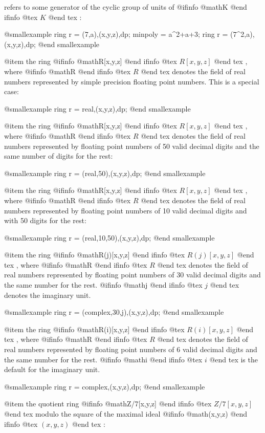 refers to some generator of the cyclic group of units of 
@ifinfo
@math{K}
@end ifinfo
@tex
$K$
@end tex
:

@smallexample
ring r = (7,a),(x,y,z),dp; minpoly = a^2+a+3;
ring r = (7^2,a),(x,y,z),dp;
@end smallexample

@item
the ring 
@ifinfo
@math{R[x,y,z]}
@end ifinfo
@tex
$R[x,y,z]$
@end tex
, where 
@ifinfo
@math{R}
@end ifinfo
@tex
$R$
@end tex
 denotes the field of real
numbers represented by simple precision floating point numbers. This is
a special case:

@smallexample
ring r = real,(x,y,z),dp;
@end smallexample

@item
the ring 
@ifinfo
@math{R[x,y,z]}
@end ifinfo
@tex
$R[x,y,z]$
@end tex
, where 
@ifinfo
@math{R}
@end ifinfo
@tex
$R$
@end tex
 denotes the field of real
numbers represented by floating point numbers of 50 valid decimal digits
and the same number of digits for the rest:

@smallexample
ring r = (real,50),(x,y,z),dp;
@end smallexample

@item
the ring 
@ifinfo
@math{R[x,y,z]}
@end ifinfo
@tex
$R[x,y,z]$
@end tex
, where 
@ifinfo
@math{R}
@end ifinfo
@tex
$R$
@end tex
 denotes the field of real
numbers represented by floating point numbers of 10 valid decimal digits
and with 50 digits for the rest:

@smallexample
ring r = (real,10,50),(x,y,z),dp;
@end smallexample

@item
the ring 
@ifinfo
@math{R(j)[x,y,z]}
@end ifinfo
@tex
$R(j)[x,y,z]$
@end tex
, where 
@ifinfo
@math{R}
@end ifinfo
@tex
$R$
@end tex
 denotes the field of real
numbers represented by floating point numbers of 30 valid decimal digits
and the same number for the rest. 
@ifinfo
@math{j}
@end ifinfo
@tex
$j$
@end tex
 denotes the imaginary unit.

@smallexample
ring r = (complex,30,j),(x,y,z),dp;
@end smallexample

@item
the ring 
@ifinfo
@math{R(i)[x,y,z]}
@end ifinfo
@tex
$R(i)[x,y,z]$
@end tex
, where 
@ifinfo
@math{R}
@end ifinfo
@tex
$R$
@end tex
 denotes the field of real
numbers represented by floating point numbers of 6 valid decimal digits
and the same number for the rest. 
@ifinfo
@math{i}
@end ifinfo
@tex
$i$
@end tex
 is the default for the imaginary unit.

@smallexample
ring r = complex,(x,y,z),dp;
@end smallexample

@item
the quotient ring 
@ifinfo
@math{Z/7[x,y,z]}
@end ifinfo
@tex
$Z/7[x,y,z]$
@end tex
 modulo the square of the maximal
ideal 
@ifinfo
@math{(x,y,z)}
@end ifinfo
@tex
$(x,y,z)$
@end tex
:

